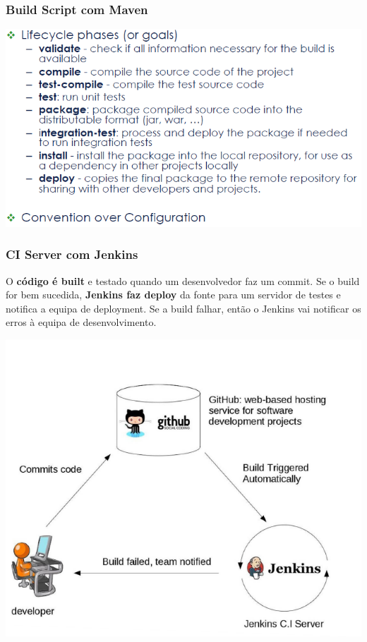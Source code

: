 \documentclass{article}
\begin{document}
\subsubsection{Build Script com Maven}

\vspace{2mm}

\begin{center}
  \includegraphics[scale=0.55]{39}
\end{center}

\pagebreak

\subsubsection{CI Server com Jenkins}

O \textbf{código é built} e testado quando um desenvolvedor
faz um commit. Se o build for bem sucedida,
\textbf{Jenkins faz deploy} da fonte para um servidor de testes
e notifica a equipa de deployment.
Se a build falhar, então o Jenkins vai notificar os erros
à equipa de desenvolvimento.

\begin{center}
  \includegraphics[scale=0.55]{40}
\end{center}
\end{document}
